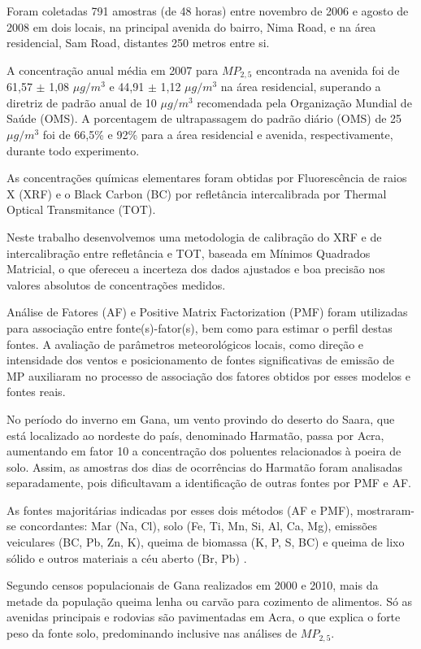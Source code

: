 Foram coletadas 791 amostras (de 48 horas) entre novembro de 2006 e 
agosto de 2008 em dois locais, na principal avenida do bairro, Nima Road, e na área 
residencial, Sam Road, distantes 250 metros entre si. 

A concentração anual média em 2007 para $MP_{2,5}$ encontrada na avenida 
foi de 61,57 $\pm$ 1,08 $\mu g/m^3$ e 44,91 $\pm$ 1,12 $\mu g/m^3$ na área residencial, 
superando a diretriz de padrão anual de 10 $\mu g/m^3$ recomendada pela 
Organização Mundial de Saúde (OMS). A porcentagem de ultrapassagem 
do padrão diário (OMS) de 25 $\mu g/m^3$ foi de 66,5\% e 92\% para a área residencial e avenida, respectivamente, durante todo experimento. 

As concentrações químicas elementares foram obtidas por 
Fluorescência de raios X (XRF) e o Black Carbon (BC) por 
refletância intercalibrada por Thermal Optical Transmitance (TOT). 

Neste trabalho desenvolvemos uma metodologia de calibração do XRF 
e de intercalibração entre refletância e TOT, 
baseada em Mínimos Quadrados Matricial, o que ofereceu a 
incerteza dos dados ajustados e boa precisão nos valores 
absolutos de concentrações medidos.

Análise de Fatores (AF) e Positive Matrix Factorization (PMF) foram utilizadas
para associação entre fonte(s)-fator(s), bem como para estimar o perfil destas fontes. 
A avaliação de parâmetros meteorológicos locais, como direção e intensidade 
dos ventos e posicionamento de fontes significativas de emissão de MP 
auxiliaram no processo de associação dos fatores obtidos por esses modelos e 
fontes reais. 

No período do inverno em Gana, um vento  
provindo do deserto do Saara, que está localizado ao nordeste do país, denominado Harmatão, 
passa por Acra, aumentando em fator 10 a concentração dos poluentes 
relacionados à poeira de solo. Assim, as amostras dos dias de ocorrências 
do Harmatão foram analisadas separadamente, pois dificultavam a 
identificação de outras fontes por PMF e AF.

As fontes majoritárias indicadas por esses dois métodos (AF e PMF), 
mostraram-se concordantes: Mar (Na, Cl), solo (Fe, Ti, Mn, 
Si, Al, Ca, Mg), emissões veiculares (BC, Pb, Zn, K), queima de 
biomassa (K, P, S, BC) e queima de lixo sólido e outros materiais a céu aberto (Br, Pb) . 

Segundo censos populacionais de Gana realizados em 2000 e 2010, 
mais da metade da população queima lenha ou carvão para cozimento 
de alimentos. Só as avenidas principais e rodovias são pavimentadas em Acra, o que explica o forte peso da fonte solo, predominando 
inclusive nas análises de $MP_{2,5}$.

